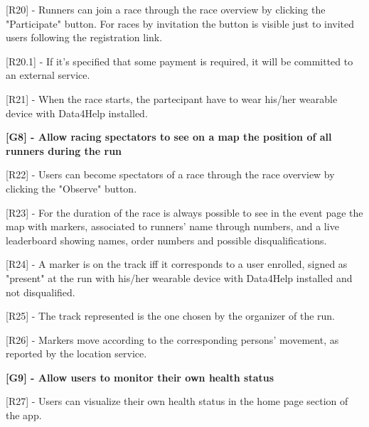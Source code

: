 [R20] - Runners can join a race through the race overview by clicking the "Participate" button. For races by invitation the button is visible just to invited users following the registration link. \newline

\hspace{\parindent}[R20.1] - If it's specified that some payment is required, it will be committed to an external service. \newline

[R21] - When the race starts, the partecipant have to wear his/her wearable device with Data4Help installed. \newline

\hspace{-\parindent}\textbf{[G8] - Allow racing spectators to see on a map the position of all runners during the run} \newline

[R22] - Users can become spectators of a race through the race overview by clicking the "Observe" button. \newline

[R23] - For the duration of the race is always possible to see in the event page the map with markers, associated to runners' name through numbers, and a live leaderboard showing names, order numbers and possible disqualifications. \newline

[R24] - A marker is on the track iff it corresponds to a user enrolled, signed as "present" at the run with his/her wearable device with Data4Help installed and not disqualified. \newline

[R25] - The track represented is the one chosen by the organizer of the run. \newline

[R26] - Markers move according to the corresponding persons' movement, as reported by the location service. \newline

\hspace{-\parindent}\textbf{[G9] - Allow users to monitor their own health status} \newline

[R27] - Users can visualize their own health status in the home page section of the app. \newline

%